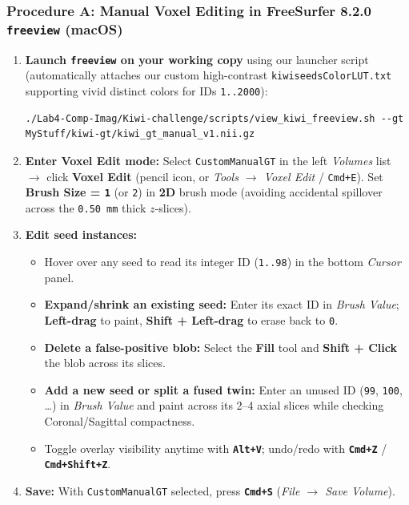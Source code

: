 \documentclass[10pt,a4paper]{article}
\renewcommand{\_}{\origunderscore\allowbreak}
\begin{document}
\subsubsection*{Procedure A: Manual Voxel Editing in FreeSurfer 8.2.0 \texttt{freeview} (macOS)}
\begin{enumerate}
\item \textbf{Launch \texttt{freeview} on your working copy} using our launcher script (automatically attaches our custom high-contrast \texttt{kiwi\_seeds\_ColorLUT.txt} supporting vivid distinct colors for IDs \texttt{1..2000}):
\begin{lstlisting}[style=bashbmed]
./Lab4-Comp-Imag/Kiwi-challenge/scripts/view_kiwi_freeview.sh --gt MyStuff/kiwi-gt/kiwi_gt_manual_v1.nii.gz
\end{lstlisting}
\item \textbf{Enter Voxel Edit mode:} Select \texttt{Custom\_Manual\_GT} in the left \textit{Volumes} list $\to$ click \textbf{Voxel Edit} (pencil icon, or \textit{Tools $\to$ Voxel Edit} /\allowbreak{} \texttt{Cmd+E}). Set \textbf{Brush Size = \texttt{1}} (or \texttt{2}) in \textbf{2D} brush mode (avoiding accidental spillover across the \texttt{0.50 mm} thick $z$-slices).
\item \textbf{Edit seed instances:}
\begin{itemize}
\item Hover over any seed to read its integer ID (\texttt{1..98}) in the bottom \textit{Cursor} panel.
\item \textbf{Expand/\allowbreak{}shrink an existing seed:} Enter its exact ID in \textit{Brush Value}; \textbf{Left-drag} to paint, \textbf{Shift + Left-drag} to erase back to \texttt{0}.
\item \textbf{Delete a false-positive blob:} Select the \textbf{Fill} tool and \textbf{Shift + Click} the blob across its slices.
\item \textbf{Add a new seed or split a fused twin:} Enter an unused ID (\texttt{99}, \texttt{100}, \ldots{}) in \textit{Brush Value} and paint across its 2--4 axial slices while checking Coronal/\allowbreak{}Sagittal compactness.
\item Toggle overlay visibility anytime with \textbf{\texttt{Alt+V}}; undo/\allowbreak{}redo with \textbf{\texttt{Cmd+Z}} /\allowbreak{} \textbf{\texttt{Cmd+Shift+Z}}.
\end{itemize}
\item \textbf{Save:} With \texttt{Custom\_Manual\_GT} selected, press \textbf{\texttt{Cmd+S}} (\textit{File $\to$ Save Volume}).
\end{enumerate}
\end{document}
